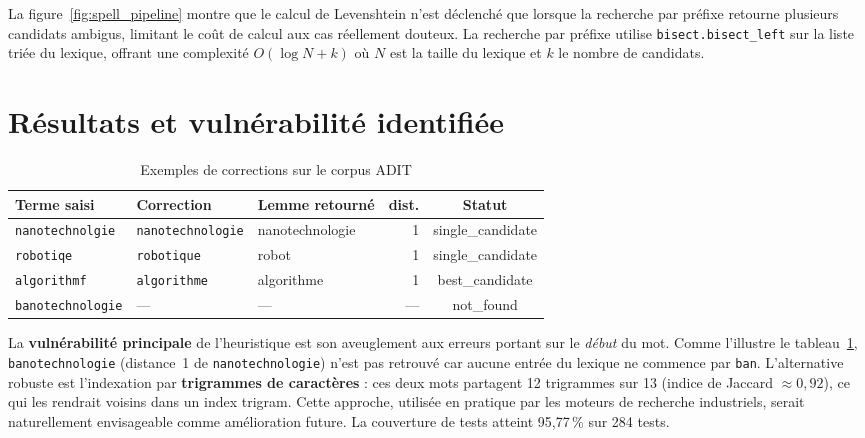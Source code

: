 La figure~\ref{fig:spell_pipeline} montre que le calcul de Levenshtein n'est déclenché
que lorsque la recherche par préfixe retourne plusieurs candidats ambigus, limitant le
coût de calcul aux cas réellement douteux. La recherche par préfixe utilise
\texttt{bisect.bisect\_left} sur la liste triée du lexique, offrant une complexité
$O(\log N + k)$ où $N$ est la taille du lexique et $k$ le nombre de candidats.

\section{Résultats et vulnérabilité identifiée}

\begin{table}[ht]
\centering
\caption{Exemples de corrections sur le corpus ADIT}
\label{tab:spell_examples}
\begin{tabular}{lllrc}
\toprule
\textbf{Terme saisi} & \textbf{Correction} & \textbf{Lemme retourné} & \textbf{dist.} & \textbf{Statut} \\
\midrule
\texttt{nanotechnolgie} & \texttt{nanotechnologie} & nanotechnologie & 1 & single\_candidate \\
\texttt{robotiqe}       & \texttt{robotique}       & robot           & 1 & single\_candidate \\
\texttt{algorithmf}     & \texttt{algorithme}      & algorithme      & 1 & best\_candidate   \\
\texttt{banotechnologie} & —                       & —               & — & not\_found        \\
\bottomrule
\end{tabular}
\end{table}

La \textbf{vulnérabilité principale} de l'heuristique est son aveuglement aux erreurs
portant sur le \emph{début} du mot. Comme l'illustre le tableau~\ref{tab:spell_examples},
\texttt{banotechnologie} (distance~1 de \texttt{nanotechnologie}) n'est pas retrouvé car
aucune entrée du lexique ne commence par \texttt{ban}. L'alternative robuste est
l'indexation par \textbf{trigrammes de caractères} : ces deux mots partagent 12 trigrammes
sur 13 (indice de Jaccard $\approx 0{,}92$), ce qui les rendrait voisins dans un index
trigram. Cette approche, utilisée en pratique par les moteurs de recherche industriels,
serait naturellement envisageable comme amélioration future. La couverture de tests
atteint 95,77\,\% sur 284 tests.
